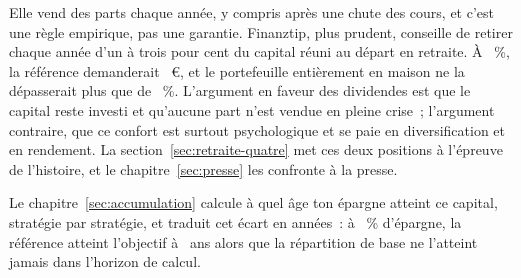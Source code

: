  Elle vend des
parts chaque ann\'ee, y compris apr\`es une chute des cours, et c'est une r\`egle empirique, pas une
garantie. Finanztip, plus prudent, conseille de retirer chaque ann\'ee d'un \`a trois pour cent du
capital r\'euni au d\'epart en retraite. \`A \TauxRetraitPrudent~\%, la r\'ef\'erence demanderait
\KapitalEtfPrudent~€, et le portefeuille enti\`erement en maison ne la d\'epasserait plus que de
\KapitalDifferenzPrudentProzent~\%. L'argument en faveur des dividendes est que le capital reste
investi et qu'aucune part n'est vendue en pleine crise~; l'argument
contraire, que ce confort est surtout psychologique et se paie en diversification et en
rendement. La section~\ref{sec:retraite-quatre} met ces deux positions \`a
l'\'epreuve de l'histoire, et le chapitre~\ref{sec:presse} les confronte \`a la presse.

 Le chapitre~\ref{sec:accumulation}
calcule \`a quel \^age ton \'epargne atteint ce capital, strat\'egie par strat\'egie, et traduit cet
\'ecart en ann\'ees~: \`a \SparquoteZwanzig~\% d'\'epargne, la r\'ef\'erence atteint l'objectif \`a
\AlterEtfReferenzZwanzig~ans alors que la r\'epartition de base ne l'atteint jamais dans l'horizon de
calcul.

